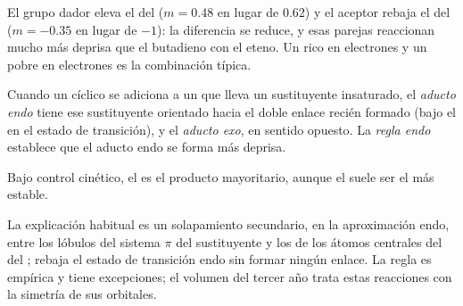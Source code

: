 El grupo dador eleva el  del  ($m = 0.48$ en lugar de 0.62) y el aceptor
rebaja el  del  ($m = -0.35$ en lugar de $-1$): la diferencia se reduce, y esas
parejas reaccionan mucho más deprisa que el butadieno con el eteno. Un  rico en electrones y un
 pobre en electrones es la combinación típica.

\begin{definition}\label{def:b2:frontier-orbitals:endo}
Cuando un  cíclico se adiciona a un  que lleva un sustituyente insaturado, el
\emph{aducto endo} tiene ese sustituyente orientado hacia el doble enlace recién
formado (bajo el  en el estado de transición), y el \emph{aducto
exo}, en sentido opuesto. La \emph{regla endo} establece
que el aducto endo se forma más deprisa.
\end{definition}

\begin{proposition}\label{prop:b2:frontier-orbitals:endo}
Bajo control cinético, el  es el producto mayoritario, aunque el 
suele ser el más estable.
\end{proposition}

\admitted

La explicación habitual es un solapamiento secundario, en la aproximación endo, entre los
lóbulos del sistema $\pi$ del sustituyente y los de los átomos centrales del  del
; rebaja el estado de transición endo sin formar ningún enlace. La regla es
empírica y tiene excepciones; el volumen del tercer año trata estas reacciones con la
simetría de sus orbitales.

